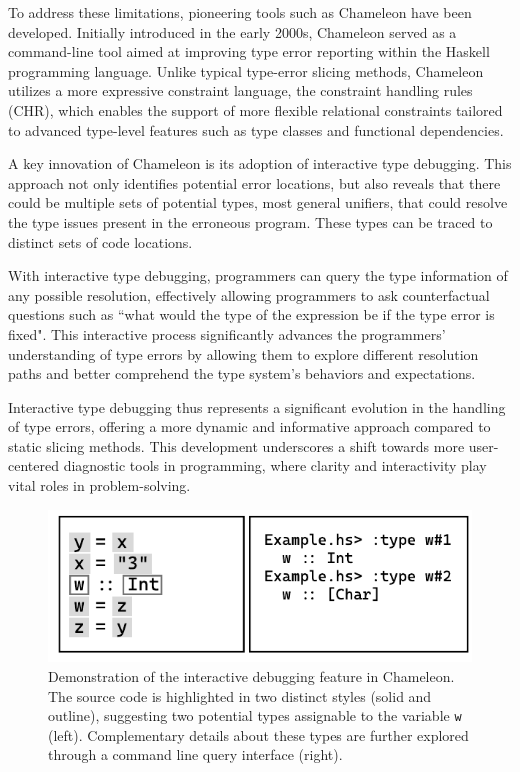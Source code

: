To address these limitations, pioneering tools such as Chameleon \cite{Stuckey2003-pz} have been developed. Initially introduced in the early 2000s, Chameleon served as a command-line tool aimed at improving type error reporting within the Haskell programming language. Unlike typical type-error slicing methods, Chameleon utilizes a more expressive constraint language, the constraint handling rules (CHR), which enables the support of more flexible relational constraints tailored to advanced type-level features such as type classes and functional dependencies.

A key innovation of Chameleon is its adoption of interactive type debugging. This approach not only identifies potential error locations, but also reveals that there could be multiple sets of potential types, most general unifiers, that could resolve the type issues present in the erroneous program. These types can be traced to distinct sets of code locations.

With interactive type debugging, programmers can query the type information of any possible resolution, effectively allowing programmers to ask counterfactual questions such as ``what would the type of the expression be if the type error is fixed". This interactive process significantly advances the programmers' understanding of type errors by allowing them to explore different resolution paths and better comprehend the type system's behaviors and expectations.

Interactive type debugging thus represents a significant evolution in the handling of type errors, offering a more dynamic and informative approach compared to static slicing methods. This development underscores a shift towards more user-centered diagnostic tools in programming, where clarity and interactivity play vital roles in problem-solving.

\begin{figure}[hbt]
  \centering
  \includegraphics[width=0.8\linewidth]{ChameleonInteractive}
  \caption[Demonstration of the interactive debugging feature in Chameleon]{
    \label{fig:chameleon-interactive}
    Demonstration of the interactive debugging feature in Chameleon. The source code is highlighted in two distinct styles (solid and outline), suggesting two potential types assignable to the variable \texttt{w} (left). Complementary details about these types are further explored through a command line query interface (right). }
\end{figure}

